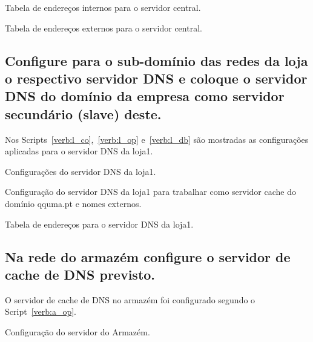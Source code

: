 \documentclass[a4paper,12pt]{article}
\begin{document}
\begin{program}
   
   \caption{Tabela de endereços internos para o servidor central.}
   \label{verb:s_dbin}
\end{program}

\begin{program}
   
   \caption{Tabela de endereços externos para o servidor central.}
   \label{verb:s_dbout}
\end{program}

\subsection{Configure para o sub-domínio das redes da loja o respectivo servidor DNS e
coloque o servidor DNS do domínio da empresa como servidor secundário
(slave) deste.}

Nos Scripts~\ref{verb:l_co},~\ref{verb:l_op} e~\ref{verb:l_db} são
mostradas as configurações aplicadas para o servidor DNS da loja1.

\begin{program}
   
   \caption{Configurações do servidor DNS da loja1.}
   \label{verb:l_co}
\end{program}

\begin{program}
   
   \caption{Configuração do servidor DNS da loja1 para trabalhar como servidor cache do domínio qquma.pt e nomes externos.}
   \label{verb:l_op}
\end{program}

\begin{program}
   
   \caption{Tabela de endereços para o servidor DNS da loja1.}
   \label{verb:l_db}
\end{program}

\subsection{Na rede do armazém configure o servidor de cache de DNS previsto.}
O servidor de cache de DNS no armazém foi configurado segundo o Script~\ref{verb:a_op}.

\begin{program}
   
   \caption{Configuração do servidor do Armazém.}
   \label{verb:a_op}
\end{program}
\end{document}
